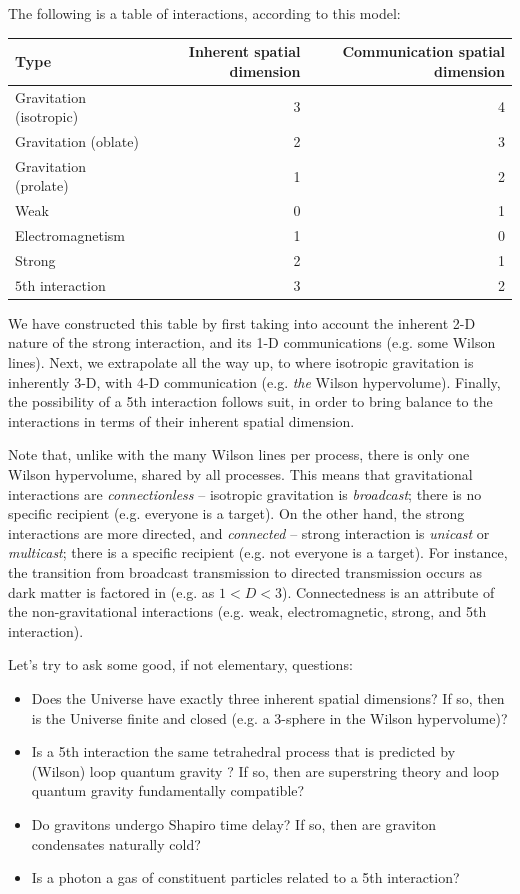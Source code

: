 \documentclass[12pt]{article}
\begin{document}
{The following is a table of interactions, according to this model:
\begin{center}
\begin{tabular}{| l | r | r |}
  \hline
  Type & Inherent spatial dimension & Communication spatial dimension \\
\hline
\hline
Gravitation (isotropic) & 3  & 4\\
Gravitation (oblate) & 2 & 3\\
Gravitation (prolate) & 1 & 2\\
Weak & 0 & 1\\
Electromagnetism & 1 & 0 \\
Strong & 2 & 1\\
$5$th interaction & 3 & 2 \\
  \hline  
\end{tabular}
\end{center}
We have constructed this table by first taking into account the inherent 2-D nature of the strong interaction, and its 1-D communications (e.g. some Wilson lines).
Next, we extrapolate all the way up, to where isotropic gravitation is inherently 3-D, with 4-D communication (e.g. {\textit{the}} Wilson hypervolume). 
Finally, the possibility of a 5th interaction follows suit, in order to bring balance to the interactions in terms of their inherent spatial dimension.

Note that, unlike with the many Wilson lines per process, there is only one Wilson hypervolume, shared by all processes.
This means that gravitational interactions are {\textit{connectionless}} -- isotropic gravitation is {\textit{broadcast}}; there is no specific recipient (e.g. everyone is a target).
On the other hand, the strong interactions are more directed, and {\textit{connected}} -- strong interaction is {\textit{unicast}} or {\textit{multicast}}; there is a specific recipient (e.g. not everyone is a target).
For instance, the transition from broadcast transmission to directed transmission occurs as dark matter is factored in (e.g. as $1 < D < 3$).
Connectedness is an attribute of the non-gravitational interactions (e.g. weak, electromagnetic, strong, and 5th interaction).

Let's try to ask some good, if not elementary, questions:
\begin{itemize}
\item Does the Universe have exactly three inherent spatial dimensions?
If so, then is the Universe finite and closed (e.g. a 3-sphere in the Wilson hypervolume)?
\item Is a 5th interaction the same tetrahedral process that is predicted by (Wilson) loop quantum gravity \cite{loop}?
If so, then are superstring theory and loop quantum gravity fundamentally compatible?
\item Do gravitons undergo Shapiro time delay?
If so, then are graviton condensates naturally cold?
\item Is a photon a gas of constituent particles related to a 5th interaction?
\end{itemize}






}
\end{document}
